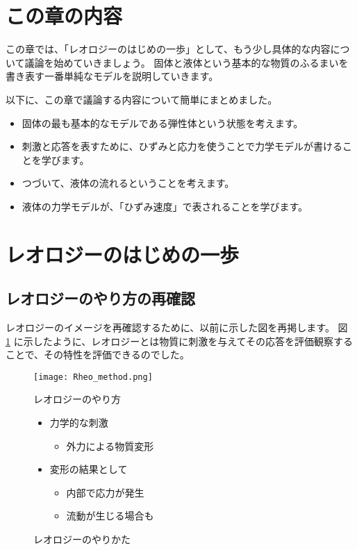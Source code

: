 \documentclass[uplatex,dvipdfmx,a4paper,11pt]{jsarticle}
\begin{document}
\section*{この章の内容}

この章では、「レオロジーのはじめの一歩」として、もう少し具体的な内容について議論を始めていきましょう。
固体と液体という基本的な物質のふるまいを書き表す一番単純なモデルを説明していきます。

以下に、この章で議論する内容について簡単にまとめました。
	\begin{boxnote}
		\large
		\begin{itemize}
			\item 固体の最も基本的なモデルである弾性体という状態を考えます。
			\item 刺激と応答を表すために、ひずみと応力を使うことで力学モデルが書けることを学びます。
			\item つづいて、液体の流れるということを考えます。
			\item 液体の力学モデルが、「ひずみ速度」で表されることを学びます。
		\end{itemize} 
	\end{boxnote}

\section{レオロジーのはじめの⼀歩}

\subsection{レオロジーのやり方の再確認}
レオロジーのイメージを再確認するために、以前に示した図を再掲します。
図 \ref{yarikata2} に示したように、レオロジーとは物質に刺激を与えてその応答を評価観察することで、その特性を評価できるのでした。
\begin{figure}[htb]
	\begin{center}
		\begin{minipage}{.45\textwidth}
			\texttt{[image: Rheo\_method.png]}
		\end{minipage}
		\begin{minipage}{.45\textwidth}
			\large
			\begin{itembox}[l]{レオロジーのやり方}
				\begin{itemize}
					\item 力学的な刺激
					\begin{itemize}
						\item 外力による物質変形
					\end{itemize}
					\item 変形の結果として
					\begin{itemize}
						\item 内部で応力が発生
						\item 流動が生じる場合も
					\end{itemize}
				\end{itemize}
			\end{itembox}
		\end{minipage}
	\caption{レオロジーのやりかた}
	\label{yarikata2}
    \end{center}
\end{figure}
\end{document}
